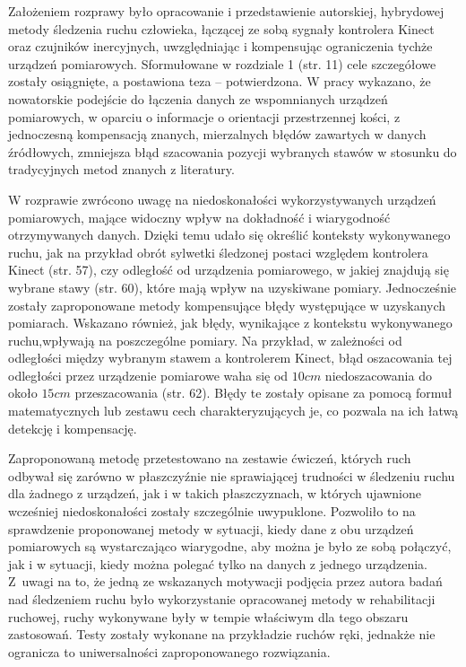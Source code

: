 \documentclass[10pt,a4paper]{article}
\begin{document}
Założeniem rozprawy było opracowanie i przedstawienie autorskiej, hybrydowej metody śledzenia ruchu człowieka, łączącej ze sobą sygnały kontrolera Kinect oraz czujników inercyjnych, uwzględniając i kompensując ograniczenia tychże urządzeń pomiarowych. Sformułowane w rozdziale 1 (str. 11) cele szczegółowe zostały osiągnięte, a postawiona teza -- potwierdzona. W pracy wykazano, że nowatorskie podejście do łączenia danych ze wspomnianych urządzeń pomiarowych, w oparciu o informacje o orientacji przestrzennej kości, z jednoczesną kompensacją znanych, mierzalnych błędów zawartych w danych źródłowych, zmniejsza błąd szacowania pozycji wybranych stawów w stosunku do tradycyjnych metod znanych z literatury.

W rozprawie zwrócono uwagę na niedoskonałości wykorzystywanych urządzeń pomiarowych, mające widoczny wpływ na dokładność i wiarygodność otrzymywanych danych. Dzięki temu udało się określić konteksty wykonywanego ruchu, jak na przykład obrót sylwetki śledzonej postaci względem kontrolera Kinect (str. 57), czy odległość od urządzenia pomiarowego, w jakiej znajdują się wybrane stawy (str. 60), które mają wpływ na uzyskiwane pomiary. Jednocześnie zostały zaproponowane metody kompensujące błędy występujące w uzyskanych pomiarach. Wskazano również, jak błędy, wynikające z kontekstu wykonywanego ruchu,wpływają na poszczególne pomiary. Na przykład, w zależności od odległości między wybranym stawem a kontrolerem Kinect, błąd oszacowania tej odległości przez urządzenie pomiarowe waha się od $10cm$ niedoszacowania do około $15cm$ przeszacowania (str. 62). Błędy te zostały opisane za pomocą formuł matematycznych lub zestawu cech charakteryzujących je, co pozwala na ich łatwą detekcję i kompensację.

Zaproponowaną metodę przetestowano na zestawie ćwiczeń, których ruch odbywał się zarówno w płaszczyźnie nie sprawiającej trudności w śledzeniu ruchu dla żadnego z urządzeń, jak i w takich płaszczyznach, w których ujawnione wcześniej niedoskonałości zostały szczególnie uwypuklone. Pozwoliło to na sprawdzenie proponowanej metody w sytuacji, kiedy dane z obu urządzeń pomiarowych są wystarczająco wiarygodne, aby można je było ze sobą połączyć, jak i w sytuacji, kiedy można polegać tylko na danych z jednego urządzenia. Z~uwagi na to, że jedną ze wskazanych motywacji podjęcia przez autora badań nad śledzeniem ruchu było wykorzystanie opracowanej metody w rehabilitacji ruchowej, ruchy wykonywane były w tempie właściwym dla tego obszaru zastosowań. Testy zostały wykonane na przykładzie ruchów ręki, jednakże nie ogranicza to uniwersalności zaproponowanego rozwiązania.
\end{document}
